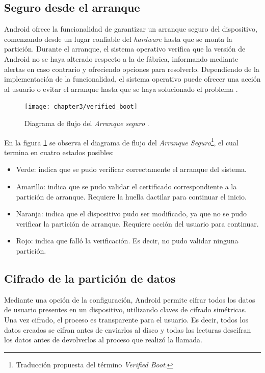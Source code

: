 \subsection{Seguro desde el arranque}\label{fig:ch03:verify-boot}
Android ofrece la funcionalidad de garantizar un arranque seguro del dispositivo, comenzando desde un lugar confiable del \textit{hardware} hasta que se monta la partición. Durante el arranque, el sistema operativo verifica que la versión de Android no se haya alterado respecto a la de fábrica, informando mediante alertas en caso contrario y ofreciendo opciones para resolverlo. Dependiendo de la implementación de la funcionalidad, el sistema operativo puede ofrecer una acción al usuario o evitar el arranque hasta que se haya solucionado el problema \cite{aossec}.\\
\begin{figure}[htbp]
	\begin{center}
		\texttt{[image: chapter3/verified\_boot]}
		\caption{Diagrama de flujo del \textit{Arranque seguro} \cite{asreview2015}.}
		\label{fig:ch03:verifyBoot}
	\end{center}
\end{figure}

En la figura \ref{fig:ch03:verifyBoot} se observa el diagrama de flujo del \textit{Arranque Seguro}\footnote{Traducción propuesta del término \textit{Verified Boot}.}, el cual termina en cuatro estados posibles:
\begin{itemize}
	\item Verde: indica que se pudo verificar correctamente el arranque del sistema.
	\item Amarillo: indica que se pudo validar el certificado correspondiente a la partición de arranque. Requiere la huella dactilar para continuar el inicio.
	\item Naranja: indica que el dispositivo pudo ser modificado, ya que no se pudo verificar la partición de arranque. Requiere acción del usuario para continuar.
	\item Rojo: indica que falló la verificación. Es decir, no pudo validar ninguna partición.
\end{itemize}
\subsection{Cifrado de la partición de datos}
Mediante una opción de la configuración, Android permite cifrar todos los datos de usuario presentes en un dispositivo, utilizando claves de cifrado simétricas. Una vez cifrado, el proceso es transparente para el usuario. Es decir, todos los datos creados se cifran antes de enviarlos al disco y todas las lecturas descifran los datos antes de devolverlos al proceso que realizó la llamada.\\

